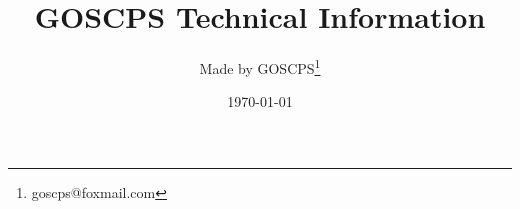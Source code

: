 \documentclass[UTF-8,twoside,a4paper,draft,titlepage]{ctexbook}
\begin{document}
\frontmatter
\title{GOSCPS Technical Information} 
\author{Made by GOSCPS\thanks{goscps@foxmail.com}}
\date{\today}
\maketitle
\tableofcontents
\mainmatter



\backmatter


\end{document}
